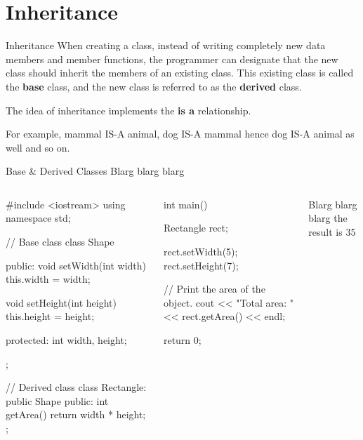 \documentclass[../lecture5-objectorientation.tex]{subfiles}
\begin{document}
\section{Inheritance}


\begin{frame}[fragile]{Inheritance}
    When creating a class, instead of writing completely new data members and member functions, the programmer can designate that the new class should inherit the members of an existing class. This existing class is called the \textbf{base} class, and the new class is referred to as the \textbf{derived} class. \newline \newline

    The idea of inheritance implements the \textbf{is a} relationship. \newline

    For example, mammal IS-A animal, dog IS-A mammal hence dog IS-A animal as well and so on.

\end{frame}


\begin{frame}[fragile]{Base \& Derived Classes}
    Blarg blarg blarg

    \begin{columns}[T,onlytextwidth]
            \begin{cppcode}[lastline=30]
#include <iostream>
using namespace std;

// Base class
class Shape
{
    public:
        void setWidth(int width)
        {
            this.width = width;
        }

        void setHeight(int height)
        {
            this.height = height;
        }

    protected:
        int width, height;
};

// Derived class
class Rectangle: public Shape
{
    public:
        int getArea()
        {
            return width * height;
        }
};
            \end{cppcode}
            \begin{cppcode}[lastline=12]
int main()
{
    Rectangle rect;

    rect.setWidth(5);
    rect.setHeight(7);

    // Print the area of the object.
    cout << "Total area: " << rect.getArea() << endl;

    return 0;
}
            \end{cppcode}

            Blarg blarg blarg the result is 35
    \end{columns}
\end{frame}
\end{document}
